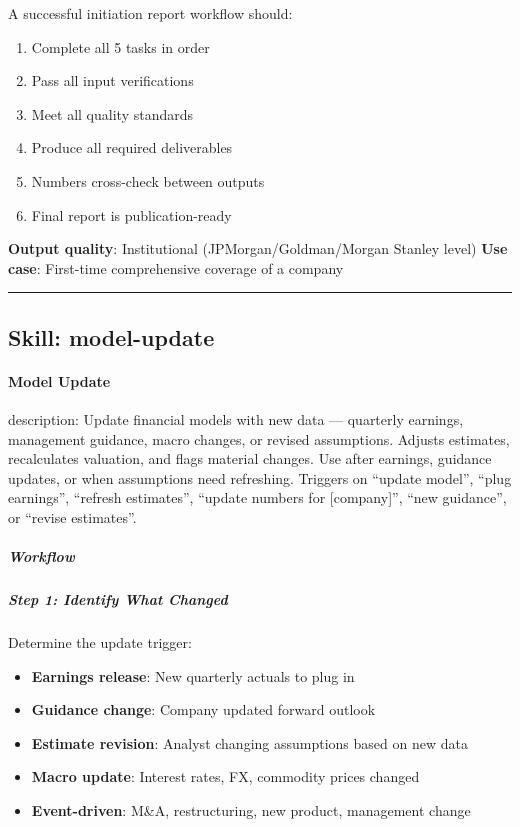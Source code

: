 \documentclass[11pt]{article}
\begin{document}
A successful initiation report workflow should:

\begin{enumerate}[leftmargin=*,itemsep=2pt,topsep=2pt]
\item {} Complete all 5 tasks in order
\item {} Pass all input verifications
\item {} Meet all quality standards
\item {} Produce all required deliverables
\item {} Numbers cross-check between outputs
\item {} Final report is publication-ready
\end{enumerate}

\textbf{Output quality}: Institutional (JPMorgan/Goldman/Morgan Stanley level) \textbf{Use case}: First-time comprehensive coverage of a company


\vspace{0.8em}\hrule\vspace{0.8em}

\subsection{Skill: model-update}\label{file:skills-model-update-SKILL-md}

\paragraph{Model Update}\mbox{}\par

description: Update financial models with new data — quarterly earnings, management guidance, macro changes, or revised assumptions. Adjusts estimates, recalculates valuation, and flags material changes. Use after earnings, guidance updates, or when assumptions need refreshing. Triggers on ``update model'', ``plug earnings'', ``refresh estimates'', ``update numbers for [company]'', ``new guidance'', or ``revise estimates''.


\subparagraph{Workflow}\mbox{}\par

\subparagraph{Step 1: Identify What Changed}\mbox{}\par

Determine the update trigger:

\begin{itemize}[leftmargin=*,itemsep=2pt,topsep=2pt]
\item {} \textbf{Earnings release}: New quarterly actuals to plug in
\item {} \textbf{Guidance change}: Company updated forward outlook
\item {} \textbf{Estimate revision}: Analyst changing assumptions based on new data
\item {} \textbf{Macro update}: Interest rates, FX, commodity prices changed
\item {} \textbf{Event-driven}: M\&A, restructuring, new product, management change
\end{itemize}
\end{document}
